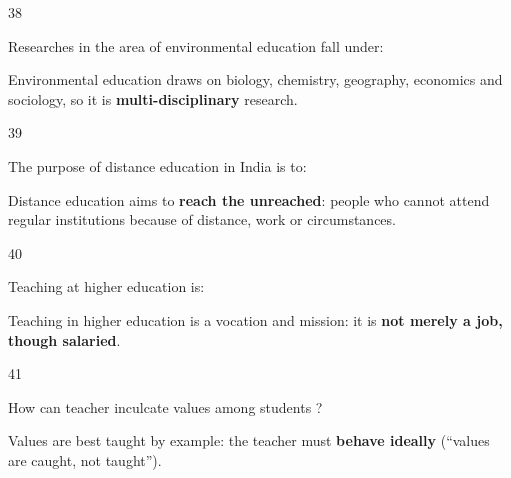 \begin{question}{38}
{Researches in the area of environmental education fall under:\par}
\begin{explain}
Environmental education draws on biology, chemistry, geography, economics and sociology, so it is \textbf{multi-disciplinary} research.
\end{explain}
\end{question}

\begin{question}{39}
{The purpose of distance education in India is to:\par}
\begin{explain}
Distance education aims to \textbf{reach the unreached}: people who cannot attend regular institutions because of distance, work or circumstances.
\end{explain}
\end{question}

\begin{question}{40}
{Teaching at higher education is:\par}
\begin{explain}
Teaching in higher education is a vocation and mission: it is \textbf{not merely a job, though salaried}.
\end{explain}
\end{question}

\begin{question}{41}
{How can teacher inculcate values among students ?\par}
\begin{explain}
Values are best taught by example: the teacher must \textbf{behave ideally} (``values are caught, not taught'').
\end{explain}
\end{question}

